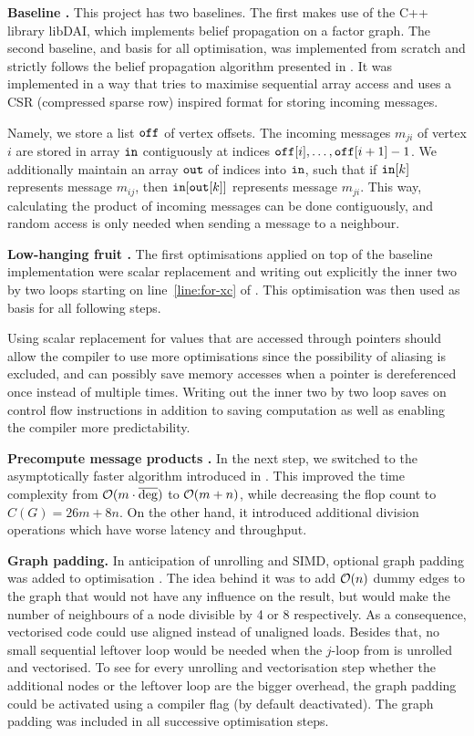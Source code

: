 \documentclass[final,letterpaper]{article}
\let\cref=\Cref %
\newcommand{\mypar}[1]{{\bf #1.}}
\begin{document}
\mypar{Baseline }
This project has two baselines. The first makes use of the C++ library libDAI, which implements belief propagation on a factor graph.
The second baseline, and basis for all optimisation, was implemented from scratch and strictly follows the belief propagation algorithm presented in \cref{sec:background}. It was implemented in a way that tries to maximise sequential array access and uses a CSR (compressed sparse row) inspired format for storing incoming messages.

Namely, we store a list $\texttt{off}$ of vertex offsets. The incoming messages $m_{ji}$ of
vertex $i$ are stored in array $\texttt{in}$ contiguously at indices $\texttt{off}[i],
\ldots, \texttt{off}[i + 1] - 1$. We additionally maintain an array $\texttt{out}$ of
indices into $\texttt{in}$, such that if $\texttt{in}[k]$ represents message $m_{ij}$,
then $\texttt{in}[\texttt{out}[k]]$ represents message $m_{ji}$. This way, calculating the product of
incoming messages can be done contiguously, and random access is only needed
when sending a message to a neighbour.

\mypar{Low-hanging fruit }
The first optimisations applied on top of the baseline implementation were scalar replacement and writing out explicitly the inner two by two loops starting on line~\ref{line:for-xc} of \cref{algo:propagate}. This optimisation was then used as basis for all following steps.

Using scalar replacement for values that are accessed through pointers should allow the compiler to use more optimisations since the possibility of aliasing is excluded, and can possibly save memory accesses when a pointer is dereferenced once instead of multiple times.
Writing out the inner two by two loop saves on control flow instructions in addition to saving computation as well as enabling the compiler more predictability.

\mypar{Precompute message products } In the next step, we switched to
the asymptotically faster algorithm introduced in \cref{subsec:faster}. This
improved the time complexity from $\mathcal{O}(m\cdot \overline{\deg})$ to $\mathcal{O}(m + n)$, while
decreasing the flop count to $C(G) = 26m + 8n$. On the other hand, it
introduced additional division operations which have worse latency and
throughput.

\mypar{Graph padding}
In anticipation of unrolling and SIMD, optional graph padding was added to optimisation . The idea behind it was to add $\mathcal{O}(n)$ dummy edges to the graph that would not have any influence on the result, but would make the number of neighbours of a node divisible by 4 or 8 respectively.
As a consequence, vectorised code could use aligned instead of unaligned loads. Besides that, no small sequential leftover loop would be needed when the $j$-loop from \cref{algo:propagate} is unrolled and vectorised.
To see for every unrolling and vectorisation step whether the additional nodes or the leftover loop are the bigger overhead, the graph padding could be activated using a compiler flag (by default deactivated).
The graph padding was included in all successive optimisation steps.
\end{document}
